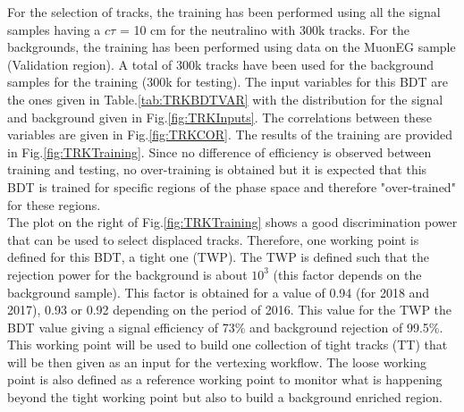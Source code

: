 \documentclass{cernatlasnote}
\begin{document}
 For the selection of tracks, the training has been performed using all the signal samples having a $c\tau$ = 10 cm for the neutralino with 300k tracks. For the backgrounds, the training has been performed using data on the MuonEG sample (Validation region). A total of 300k tracks have been used for the background samples for the training (300k for testing). 
 The input variables for this BDT are the ones given in Table.\ref{tab:TRKBDTVAR} with the distribution for the signal and background given in Fig.\ref{fig:TRKInputs}. The correlations between these variables are given in Fig.\ref{fig:TRKCOR}. The results of the training are provided in Fig.\ref{fig:TRKTraining}. Since no difference of efficiency is observed between training and testing, no over-training is obtained but it is expected that this BDT is trained for specific regions of the phase space and therefore "over-trained" for these regions. \\
 The plot on the right of Fig.\ref{fig:TRKTraining} shows a good discrimination power that can be used to select displaced tracks. Therefore, one working point is defined for this BDT, a tight one (TWP). The TWP is defined such that the rejection power for the background is about $10^3$ (this factor depends on the background sample). This factor is obtained for a value of 0.94 (for 2018 and 2017), 0.93 or 0.92 depending on the period of 2016. This value for the TWP the BDT value giving a signal efficiency of 73\% and background rejection of 99.5\%. This working point will be used to build one collection of tight tracks (TT) that will be then given as an input for the vertexing workflow. The loose working point is also defined as a reference working point to monitor what is happening beyond the tight working point but also to build a background enriched region.
\end{document}
